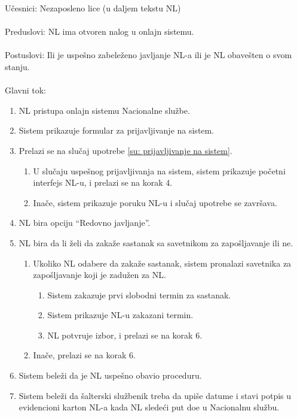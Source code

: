 \noindent U\v cesnici: Nezaposleno lice (u daljem tekstu NL)
\\
\\ Preduslovi: NL ima otvoren nalog u onlajn sistemu.
\\
\\ Postuslovi: Ili je uspe\v sno zabele\v zeno javljanje NL-a ili je NL obave\v sten o svom stanju.
\\ 
\\ Glavni tok:
\begin{enumerate}
	\item NL pristupa onlajn sistemu Nacionalne slu\v zbe.
	\item Sistem prikazuje formular za prijavljivanje na sistem.
	\item Prelazi se na slu\v caj upotrebe \ref{su: prijavljivanje na sistem}.
	\begin{enumerate}
		\item U slu\v caju uspe\v snog prijavljivanja na sistem, sistem prikazuje po\v cetni interfejs NL-u, i prelazi se na korak 4.
		\item Ina\v ce, sistem prikazuje poruku NL-u i slu\v caj upotrebe se zavr\v sava.
	\end{enumerate}
	\item NL bira opciju ``Redovno javljanje''.
	\item NL bira da li \v zeli da zaka\v ze sastanak sa savetnikom za zapo\v sljavanje ili ne.
	\begin{enumerate}
		\item Ukoliko NL odabere da zaka\v ze sastanak, sistem pronalazi savetnika za zapo\v sljavanje koji je zadu\v zen za NL.
		\begin{enumerate}
			\item Sistem zakazuje prvi slobodni termin za sastanak.
			\item Sistem prikazuje NL-u zakazani termin.
			\item NL potvr\dj uje izbor, i prelazi se na korak 6.
		\end{enumerate}
		\item Ina\v ce, prelazi se na korak 6.
	\end{enumerate}
	\item Sistem bele\v zi da je NL uspe\v sno obavio proceduru.
	\item Sistem bele\v zi da \v salterski slu\v zbenik treba da upi\v se datume i stavi potpis u evidencioni karton NL-a kada NL slede\'ci put do\dj e u Nacionalnu slu\v zbu.
\end{enumerate}

